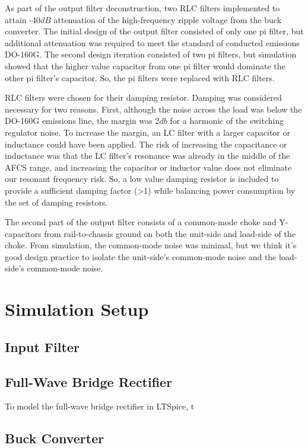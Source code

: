 \documentclass[conference]{IEEEtran}
\begin{document}
As part of the output filter deconstruction, two RLC filters implemented to attain -40${dB}$ attenuation of the high-frequency ripple voltage from the buck converter. The initial design of the output filter consisted of only one pi filter, but additional attenuation was required to meet the standard of conducted emissions DO-160G. The second design iteration consisted of two pi filters, but simulation showed that the higher value capacitor from one pi filter would dominate the other pi filter's capacitor. So, the pi filters were replaced with RLC filters.

RLC filters were chosen for their damping resistor. Damping was considered necessary for two reasons. First, although the noise across the load was below the DO-160G emissions line, the margin was 2${db}$ for a harmonic of the switching regulator noise. To increase the margin, an LC filter with a larger capacitor or inductance could have been applied. The risk of increasing the capacitance or inductance was that the LC filter's resonance was already in the middle of the AFCS range, and increasing the capacitor or inductor value does not eliminate our resonant frequency risk. So, a low value damping resistor is included to provide a sufficient damping factor (>1) while balancing power consumption by the set of damping resistors.

The second part of the output filter consists of a common-mode choke and Y-capacitors from rail-to-chassis ground on both the unit-side and load-side of the choke. From simulation, the common-mode noise was minimal, but we think it's good design practice to isolate the unit-side's common-mode noise and the load-side's common-mode noise.

\section{Simulation Setup}

\subsection{Input Filter}

\subsection{Full-Wave Bridge Rectifier}
To model the full-wave bridge rectifier in LTSpice, t

\subsection{Buck Converter}
\end{document}
